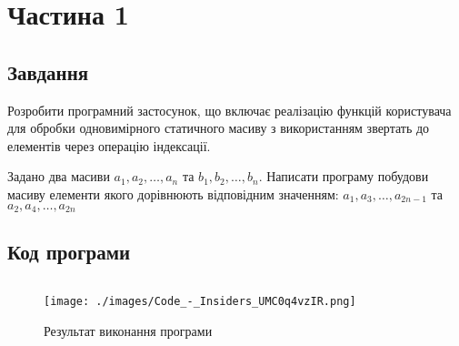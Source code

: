 \section{Частина 1}
\label{sec:task1}

\subsection{Завдання}
\label{subsec:task1_task}

Розробити програмний застосунок, що включає реалізацію функцій
користувача для обробки одновимірного статичного масиву з
використанням звертать до елементів через операцію індексації.

Задано два масиви
$a_1, a_2, \dots, a_n$ та
$b_1, b_2, \dots, b_n$.
Написати програму побудови масиву елементи якого дорівнюють
відповідним значенням:
$a_1, a_3, \dots, a_{2n - 1}$ та
$a_2, a_4, \dots, a_{2n}$

\subsection{Код програми}
\label{subsec:task1_code}
\inputminted{cpp}{../src/task1.cpp}

\begin{figure}[!ht]
    \centering
    \texttt{[image: ./images/Code\_-\_Insiders\_UMC0q4vzIR.png]}
    \caption{Результат виконання програми}
    \label{fig:task1_exec}
\end{figure}
